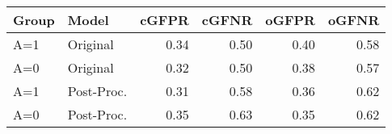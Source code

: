 \begin{tabular}{llrrrr}
  \hline
Group & Model & cGFPR & cGFNR & oGFPR & oGFNR \\ 
  \hline
A=1 & Original & 0.34 & 0.50 & 0.40 & 0.58 \\ 
  A=0 & Original & 0.32 & 0.50 & 0.38 & 0.57 \\ 
  A=1 & Post-Proc. & 0.31 & 0.58 & 0.36 & 0.62 \\ 
  A=0 & Post-Proc. & 0.35 & 0.63 & 0.35 & 0.62 \\ 
   \hline
\end{tabular}

